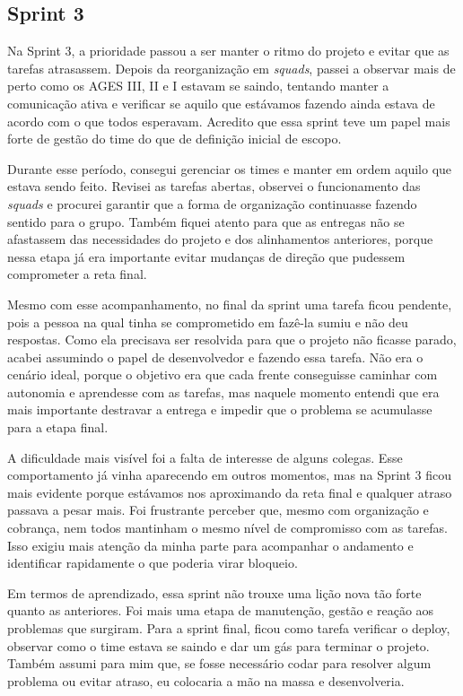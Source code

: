 \subsection{Sprint 3}

Na Sprint 3, a prioridade passou a ser manter o ritmo do projeto e evitar que as tarefas atrasassem. Depois da reorganização em \textit{squads}, passei a observar mais de perto como os AGES III, II e I estavam se saindo, tentando manter a comunicação ativa e verificar se aquilo que estávamos fazendo ainda estava de acordo com o que todos esperavam. Acredito que essa sprint teve um papel mais forte de gestão do time do que de definição inicial de escopo.

Durante esse período, consegui gerenciar os times e manter em ordem aquilo que estava sendo feito. Revisei as tarefas abertas, observei o funcionamento das \textit{squads} e procurei garantir que a forma de organização continuasse fazendo sentido para o grupo. Também fiquei atento para que as entregas não se afastassem das necessidades do projeto e dos alinhamentos anteriores, porque nessa etapa já era importante evitar mudanças de direção que pudessem comprometer a reta final.

Mesmo com esse acompanhamento, no final da sprint uma tarefa ficou pendente, pois a pessoa na qual tinha se comprometido em fazê-la sumiu e não deu respostas. Como ela precisava ser resolvida para que o projeto não ficasse parado, acabei assumindo o papel de desenvolvedor e fazendo essa tarefa. Não era o cenário ideal, porque o objetivo era que cada frente conseguisse caminhar com autonomia e aprendesse com as tarefas, mas naquele momento entendi que era mais importante destravar a entrega e impedir que o problema se acumulasse para a etapa final.

A dificuldade mais visível foi a falta de interesse de alguns colegas. Esse comportamento já vinha aparecendo em outros momentos, mas na Sprint 3 ficou mais evidente porque estávamos nos aproximando da reta final e qualquer atraso passava a pesar mais. Foi frustrante perceber que, mesmo com organização e cobrança, nem todos mantinham o mesmo nível de compromisso com as tarefas. Isso exigiu mais atenção da minha parte para acompanhar o andamento e identificar rapidamente o que poderia virar bloqueio.

Em termos de aprendizado, essa sprint não trouxe uma lição nova tão forte quanto as anteriores. Foi mais uma etapa de manutenção, gestão e reação aos problemas que surgiram. Para a sprint final, ficou como tarefa verificar o deploy, observar como o time estava se saindo e dar um gás para terminar o projeto. Também assumi para mim que, se fosse necessário codar para resolver algum problema ou evitar atraso, eu colocaria a mão na massa e desenvolveria.
